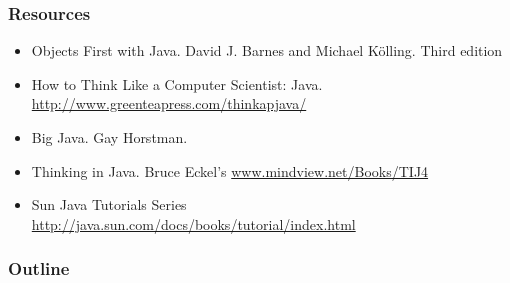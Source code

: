 
%

\author[Lecture D.7.]{Lecture D.7.: Java: Objects First
\\\begin{center}\end{center}}

\lstset{language=Java}




\def\gap{\qquad}
\let\ul\underline
\def\function#1{{\keytext{#1}}}





\maketitle

\begin{frame}\frametitle{Resources}
\begin{itemize}
\item Objects First with Java. David J. Barnes and Michael K\"olling. Third edition
\item How to Think Like a Computer Scientist: Java. \url{http://www.greenteapress.com/thinkapjava/}
\item Big Java. Gay Horstman.
\item Thinking in Java. Bruce Eckel's \url{www.mindview.net/Books/TIJ4}
\item Sun Java Tutorials Series \url{http://java.sun.com/docs/books/tutorial/index.html}
\end{itemize}
\end{frame}

\begin{frame}\frametitle{Outline}
\end{frame}

